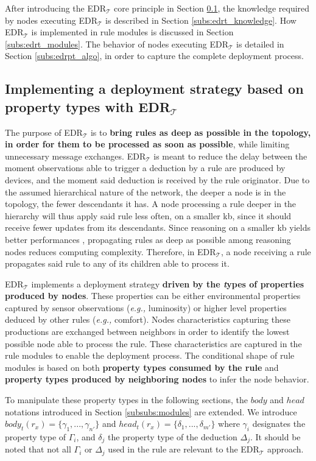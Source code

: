 \documentclass{iosart2c}
\newcommand{\edrt}{EDR$_{\mathcal{T}}$\xspace}
\begin{document}
After introducing the \edrt core principle in Section \textsection \ref{subs:overview_edrt}, the knowledge required by nodes executing \edrt is described in Section \textsection \ref{subs:edrt_knowledge}.
How \edrt is implemented in rule modules is discussed in Section \textsection \ref{subs:edrt_modules}.
The behavior of nodes executing \edrt is detailed in Section \textsection \ref{subs:edrpt_algo}, in order to capture the complete deployment process.

\subsection{Implementing a deployment strategy based on property types with \edrt}
\label{subs:overview_edrt}

The purpose of \edrt is to \textbf{bring rules as deep as possible in the topology, in order for them to be processed as soon as possible}, while limiting unnecessary message exchanges.
\edrt is meant to reduce the delay between the moment observations able to trigger a deduction by a rule are produced by devices, and the moment said deduction is received by the rule originator.
Due to the assumed hierarchical nature of the network, the deeper a node is in the topology, the fewer descendants it has.
A node processing a rule deeper in the hierarchy will thus apply said rule less often, on a smaller \gls{kb}, since it should receive fewer updates from its descendants.
Since reasoning on a smaller \gls{kb} yields better performances \cite{Maarala2017}, propagating rules as deep as possible among reasoning nodes reduces computing complexity.
Therefore, in \edrt, a node receiving a rule propagates said rule to any of its children able to process it. 

\edrt implements a deployment strategy \textbf{driven by the \textit{t}ypes of properties produced by nodes}.
These properties can be either environmental properties captured by sensor observations (\textit{e.g.,} luminosity) or higher level properties deduced by other rules (\textit{e.g.,} comfort).
Nodes characteristics capturing these productions are exchanged between neighbors in order to identify the lowest possible node able to process the rule.
These characteristics are captured in the rule modules to enable the deployment process.
The conditional shape of rule modules is based on both \textbf{property types consumed by the rule} and \textbf{property types produced by neighboring nodes} to infer the node behavior.

To manipulate these property types in the following sections, the $body$ and $head$ notations introduced in Section \textsection \ref{subsubs:modules} are extended. 
We introduce $body_t(r_{x})=\{\gamma_{1},...,\gamma_{n'}\}$ and $head_t(r_{x})=\{\delta_{1}, ..., \delta_{m'}\}$ where $\gamma_{i}$ designates the property type of $\Gamma_{i}$, and $\delta_{j}$ the property type of the deduction $\Delta_{j}$.
It should be noted that not all $\Gamma_{i}$ or $\Delta_{j}$ used in the rule are relevant to the \edrt approach.
\end{document}
